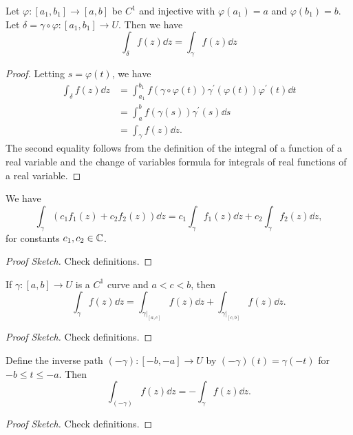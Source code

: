 \documentclass[a4paper]{scrartcl}
\begin{document}
\begin{proposition}
Let $\varphi:\left[a_{1}, b_{1}\right] \rightarrow[a, b]$ be $C^{1}$ and injective with $\varphi\left(a_{1}\right)=a$ and $\varphi\left(b_{1}\right)=b$. Let
$\delta=\gamma \circ \varphi:\left[a_{1}, b_{1}\right] \rightarrow U$. Then we have
$$
\int_{\delta} f(z) \dd z=\int_{\gamma} f(z) \dd z
$$
\end{proposition}
\begin{proof}
    Letting $s = \varphi(t)$, we have
    \begin{align*}
\int_{\delta} f(z) \dd z&=\int_{a_{1}}^{b_{1}} f(\gamma \circ \varphi(t)) \gamma^{\prime}(\varphi(t)) \varphi^{\prime}(t) \dd t \\
&= \int_{a}^{b} f(\gamma(s)) \gamma^{\prime}(s) \dd s \\ &=\int_{\gamma} f(z) \dd z.
    \end{align*}
    The second equality follows from the definition of the integral of a function of a real variable and the change of variables formula for integrals of real functions of a real variable.
\end{proof}

\begin{proposition}[Linearity]
    We have
    $$
    \int_{\gamma}\left(c_{1} f_{1}(z)+c_{2} f_{2}(z)\right) \dd z=c_{1} \int_{\gamma} f_{1}(z) \dd z+c_{2} \int_{\gamma} f_{2}(z) \dd z,
    $$
    for constants $c_1, c_2 \in \mathbb{C}$.
\end{proposition}
\begin{proof}[Proof Sketch]    
    Check definitions.
\end{proof}

\begin{proposition}[Additivity]
    If $\gamma:[a, b] \rightarrow U$ is a $C^{1}$ curve and $a<c<b$, then 
    $$\int_{\gamma} f(z) \dd z=\int_{\left.\gamma\right|_{[a, c]}} f(z) \dd z+\int_{\left.\gamma\right|_{[c, b]}} f(z) \dd z .
    $$
\end{proposition}
\begin{proof}[Proof Sketch]    
    Check definitions.
\end{proof}

\begin{proposition}
Define the inverse path $(-\gamma):[-b,-a] \rightarrow U$ by $(-\gamma)(t)=\gamma(-t)$ for $-b \leq t \leq-a$. Then
$$
\int_{(-\gamma)} f(z) \dd z=-\int_{\gamma} f(z) \dd z .
$$
\end{proposition}
\begin{proof}[Proof Sketch]    
    Check definitions.
\end{proof}
\end{document}
